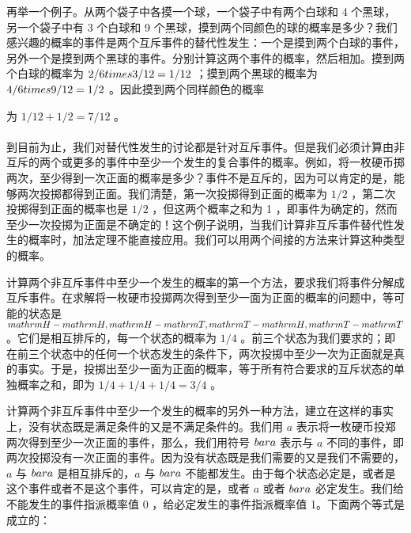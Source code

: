 再举一个例子。从两个袋子中各摸一个球，一个袋子中有两个白球和 4 个黑球，另一个袋子中有 3 个白球和 9 个黑球，摸到两个同颜色的球的概率是多少？我们感兴趣的概率的事件是两个互斥事件的替代性发生：一个是摸到两个白球的事件，另外一个是摸到两个黑球的事件。分别计算这两个事件的概率，然后相加。摸到两个白球的概率为 $2 / 6 \\times 3 / 12=1 / 12$ ；摸到两个黑球的概率为 $4 / 6 \\times 9 / 12=1 / 2$ 。因此摸到两个同样颜色的概率

为 $1 / 12+1 / 2=7 / 12$ 。\\\\到目前为止，我们对替代性发生的讨论都是针对互斥事件。但是我们必须计算由非互斥的两个或更多的事件中至少一个发生的复合事件的概率。例如，将一枚硬币掷两次，至少得到一次正面的概率是多少？事件不是互斥的，因为可以肯定的是，能够两次投掷都得到正面。我们清楚，第一次投掷得到正面的概率为 $1 / 2$ ，第二次投掷得到正面的概率也是 $1 / 2$ ，但这两个概率之和为 1 ，即事件为确定的，然而至少一次投掷为正面是不确定的！这个例子说明，当我们计算非互斥事件替代性发生的概率时，加法定理不能直接应用。我们可以用两个间接的方法来计算这种类型的概率。

计算两个非互斥事件中至少一个发生的概率的第一个方法，要求我们将事件分解成互斥事件。在求解将一枚硬市投掷两次得到至少一面为正面的概率的问题中，等可能的状态是 $\\mathrm{H}-\\mathrm{H}, \\mathrm{H}-\\mathrm{T}, \\mathrm{T}-\\mathrm{H}, \\mathrm{T}-\\mathrm{T}$ 。它们是相互排斥的，每一个状态的概率为 $1 / 4$ 。前三个状态为我们要求的；即在前三个状态中的任何一个状态发生的条件下，两次投掷中至少一次为正面就是真的事实。于是，投掷出至少一面为正面的概率，等于所有符合要求的互斥状态的单独概率之和，即为 $1 / 4+1 / 4+1 / 4=3 / 4$ 。

计算两个非互斥事件中至少一个发生的概率的另外一种方法，建立在这样的事实上，没有状态既是满足条件的又是不满足条件的。我们用 $a$ 表示将一枚硬币投郑两次得到至少一次正面的事件，那么，我们用符号 $\\bar{a}$ 表示与 $a$ 不同的事件，即两次投掷没有一次正面的事件。因为没有状态既是我们需要的又是我们不需要的，$a$ 与 $\\bar{a}$ 是相互排斥的，$a$ 与 $\\bar{a}$ 不能都发生。由于每个状态必定是，或者是这个事件或者不是这个事件，可以肯定的是，或者 $a$ 或者 $\\bar{a}$ 必定发生。我们给不能发生的事件指派概率值 0 ，给必定发生的事件指派概率值 1。下面两个等式是成立的：

